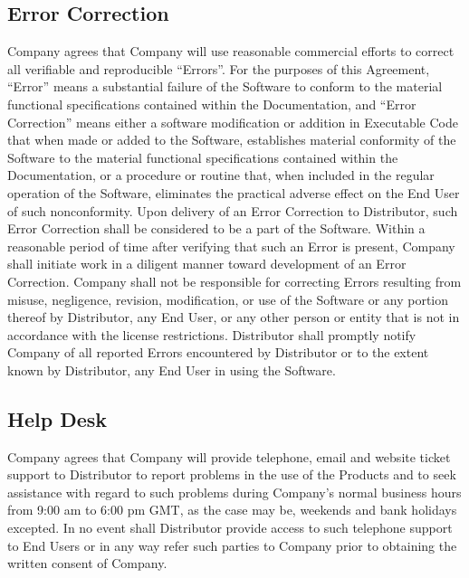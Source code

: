 \documentclass[letterpaper,10pt,openany,oneside,english]{sphinxmanual}
\begin{document}
\subsection{Error Correction}
\label{\detokenize{maintenanceservice:error-correction}}
Company agrees that Company will use reasonable commercial efforts to correct all verifiable and reproducible “Errors”. For the purposes of this Agreement, “Error” means a substantial failure of the Software to conform to the material functional specifications contained within the Documentation, and “Error Correction” means either a software modification or addition in Executable Code that when made or added to the Software, establishes material conformity of the Software to the material functional specifications contained within the Documentation, or a procedure or routine that, when included in the regular operation of the Software, eliminates the practical adverse effect on the End User of such nonconformity. Upon delivery of an Error Correction to Distributor, such Error Correction shall be considered to be a part of the Software. Within a reasonable period of time after verifying that such an Error is present, Company shall initiate work in a diligent manner toward development of an Error Correction. Company shall not be responsible for correcting Errors resulting from misuse, negligence, revision, modification, or use of the Software or any portion thereof by Distributor, any End User, or any other person or entity that is not in accordance with the license restrictions.  Distributor shall promptly notify Company of all reported Errors encountered by Distributor or to the extent known by Distributor, any End User in using the Software.


\subsection{Help Desk}
\label{\detokenize{maintenanceservice:help-desk}}
Company agrees that Company will provide telephone, email and website ticket support to Distributor to report problems in the use of the Products and to seek assistance with regard to such problems during Company’s normal business hours from 9:00 am to 6:00 pm GMT, as the case may be, weekends and bank holidays excepted. In no event shall Distributor provide access to such telephone support to End Users or in any way refer such parties to Company prior to obtaining the written consent of Company.
\end{document}
